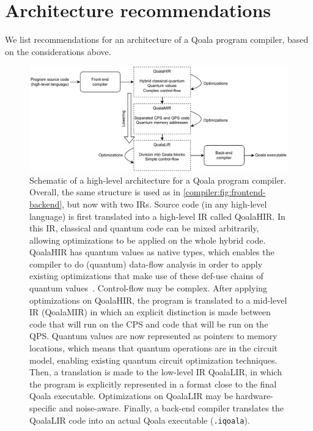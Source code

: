 \section{Architecture recommendations}
We list recommendations for an architecture of a Qoala program compiler, based on the considerations above.

\begin{figure}[t]
    \centering
    \includegraphics[width=1.0\textwidth]{figures/compiler/overall-design.pdf}
    \caption{Schematic of a high-level architecture for a Qoala program compiler.
    Overall, the same structure is used as in \cref{compiler:fig:frontend-backend}, but now with two \ac{IR}s.
    Source code (in any high-level language) is first translated into a high-level \ac{IR} called QoalaHIR. In this \ac{IR}, classical and quantum code can be mixed arbitrarily, allowing optimizations to be applied on the whole hybrid code.
    QoalaHIR has quantum values as native types, which enables the compiler to do (quantum) data-flow analysis in order to apply existing optimizations that make use of these def-use chains of quantum values~\cite{peduri_qssa_2022}. Control-flow may be complex.
    After applying optimizations on QoalaHIR, the program is translated to a mid-level \ac{IR} (QoalaMIR) in which an explicit distinction is made between code that will run on the CPS and code that will be run on the QPS.
    Quantum values are now represented as pointers to memory locations, which means that quantum operations are in the circuit model, enabling existing quantum circuit optimization techniques.
    Then, a translation is made to the low-level IR QoalaLIR, in which the program is explicitly represented in a format close to the final Qoala executable.
    Optimizations on QoalaLIR may be hardware-specific and noise-aware.
    Finally, a back-end compiler translates the QoalaLIR code into an actual Qoala executable (\texttt{.iqoala}).
    }
    \label{compiler:fig:overall-design}
\end{figure}

